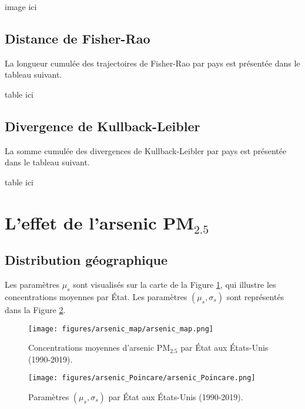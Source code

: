 image ici

\subsection{Distance de Fisher-Rao}

La longueur cumulée des trajectoires de Fisher-Rao par pays est présentée dans le tableau suivant.

%
table ici

\subsection{Divergence de Kullback-Leibler}

La somme cumulée des divergences de Kullback-Leibler par pays est présentée dans le tableau suivant.

%
table ici



\section{L'effet de l'arsenic PM$_{2.5}$}

\subsection{Distribution géographique}

Les paramètres $\mu_s$ sont visualisés sur la carte de la Figure \ref{fig:arsenic-map}, qui illustre les concentrations moyennes par État. Les paramètres $(\mu_s, \sigma_s)$ sont représentés dans la Figure \ref{fig:arsenic_Poincare}.

\begin{figure}[H]
	\centering
	\texttt{[image: figures/arsenic\_map/arsenic\_map.png]}
	\caption{Concentrations moyennes d'arsenic PM$_{2.5}$ par État aux États-Unis (1990-2019).}
	\label{fig:arsenic-map}
\end{figure}

\begin{figure}[H]
	\centering
	\texttt{[image: figures/arsenic\_Poincare/arsenic\_Poincare.png]}
	\caption{Paramètres $(\mu_s, \sigma_s)$ par État aux États-Unis (1990-2019).}
	\label{fig:arsenic_Poincare}
\end{figure}

